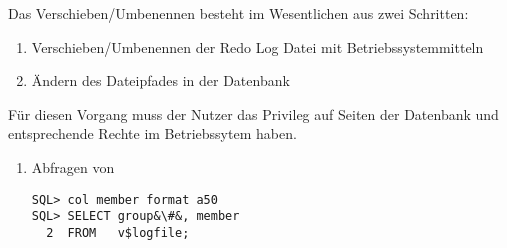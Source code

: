         Das Verschieben/Umbenennen besteht im Wesentlichen aus zwei Schritten:
        \begin{enumerate}
          \item Verschieben/Umbenennen der Redo Log Datei mit Betriebssystemmitteln
          \item Ändern des Dateipfades in der Datenbank
        \end{enumerate}
        Für diesen Vorgang muss der Nutzer das Privileg  auf Seiten der Datenbank und entsprechende Rechte im Betriebssytem haben.
        \begin{enumerate}
          \item Abfragen von 
            \begin{lstlisting}[caption={Speicherorte der Member ermitteln},label=admin35,language=oracle_sql,alsolanguage=sqlplus]
SQL> col member format a50
SQL> SELECT group&\#&, member
  2  FROM   v$logfile;


\end{lstlisting}
\end{enumerate}
